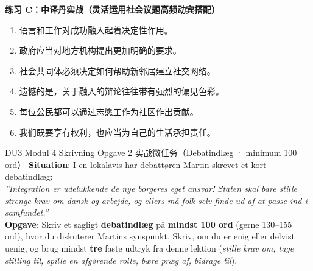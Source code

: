 \textbf{练习 C：中译丹实战（灵活运用社会议题高频动宾搭配）}
\begin{enumerate}
  \item 语言和工作对成功融入起着决定性作用。
  \item 政府应当对地方机构提出更加明确的要求。
  \item 社会共同体必须决定如何帮助新邻居建立社交网络。
  \item 遗憾的是，关于融入的辩论往往带有强烈的偏见色彩。
  \item 每位公民都可以通过志愿工作为社区作出贡献。
  \item 我们既要享有权利，也应当为自己的生活承担责任。
\end{enumerate}


\begin{emailbox}{DU3 Modul 4 Skrivning Opgave 2 实战微任务（Debatindlæg · minimum 100 ord）}
\textbf{Situation}: I en lokalavis har debattøren Martin skrevet et kort debatindlæg:\\
\textit{”Integration er udelukkende de nye borgeres eget ansvar! Staten skal bare stille strenge krav om dansk og arbejde, og ellers må folk selv finde ud af at passe ind i samfundet.”}\\[3pt]
\textbf{Opgave}: Skriv et sagligt \textbf{debatindlæg} på \textbf{mindst 100 ord} (gerne 130--155 ord), hvor du diskuterer Martins synspunkt. Skriv, om du er enig eller delvist uenig, og brug mindst \textbf{tre} faste udtryk fra denne lektion (\textit{stille krav om, tage stilling til, spille en afgørende rolle, bære præg af, bidrage til}).
\end{emailbox}

